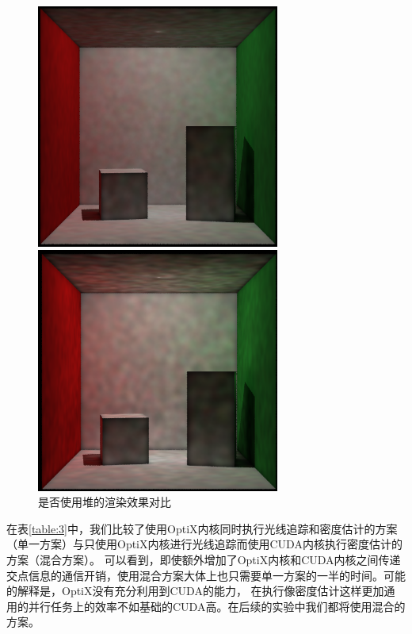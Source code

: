 \documentclass[UTF8]{ctexart}
\begin{document}
        \begin{figure}[H]
            \centering
            \begin{minipage}[t]{0.48\textwidth}
            \centering
            \includegraphics[width=8cm]{pic/useheap.png}
            \end{minipage}
            \begin{minipage}[t]{0.48\textwidth}
            \centering
            \includegraphics[width=8cm]{pic/withoutHeap.png}
            \end{minipage}
            \caption{是否使用堆的渲染效果对比}
            \label{fig:8}
        \end{figure}
        
        在表\ref{table:3}中，我们比较了使用OptiX内核同时执行光线追踪和密度估计的方案（单一方案）与只使用OptiX内核进行光线追踪而使用CUDA内核执行密度估计的方案（混合方案）。
        可以看到，即使额外增加了OptiX内核和CUDA内核之间传递交点信息的通信开销，使用混合方案大体上也只需要单一方案的一半的时间。可能的解释是，OptiX没有充分利用到CUDA的能力，
        在执行像密度估计这样更加通用的并行任务上的效率不如基础的CUDA高。在后续的实验中我们都将使用混合的方案。
        
\end{document}
